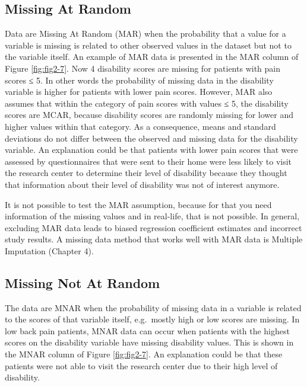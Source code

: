 \documentclass[
]{book}
\begin{document}
\hypertarget{missing-at-random}{%
\subsection{Missing At Random}\label{missing-at-random}}

Data are Missing At Random (MAR) when the probability that a value for a variable is missing is related to other observed values in the dataset but not to the variable itself. An example of MAR data is presented in the MAR column of Figure \ref{fig:fig2-7}. Now 4 disability scores are missing for patients with pain scores ≤ 5. In other words the probability of missing data in the disability variable is higher for patients with lower pain scores. However, MAR also assumes that within the category of pain scores with values ≤ 5, the disability scores are MCAR, because disability scores are randomly missing for lower and higher values within that category. As a consequence, means and standard deviations do not differ between the observed and missing data for the disability variable. An explanation could be that patients with lower pain scores that were assessed by questionnaires that were sent to their home were less likely to visit the research center to determine their level of disability because they thought that information about their level of disability was not of interest anymore.

It is not possible to test the MAR assumption, because for that you need information of the missing values and in real-life, that is not possible. In general, excluding MAR data leads to biased regression coefficient estimates and incorrect study results. A missing data method that works well with MAR data is Multiple Imputation (Chapter 4).

\hypertarget{missing-not-at-random}{%
\subsection{Missing Not At Random}\label{missing-not-at-random}}

The data are MNAR when the probability of missing data in a variable is related to the scores of that variable itself, e.g.~mostly high or low scores are missing. In low back pain patients, MNAR data can occur when patients with the highest scores on the disability variable have missing disability values. This is shown in the MNAR column of Figure \ref{fig:fig2-7}. An explanation could be that these patients were not able to visit the research center due to their high level of disability.
\end{document}
